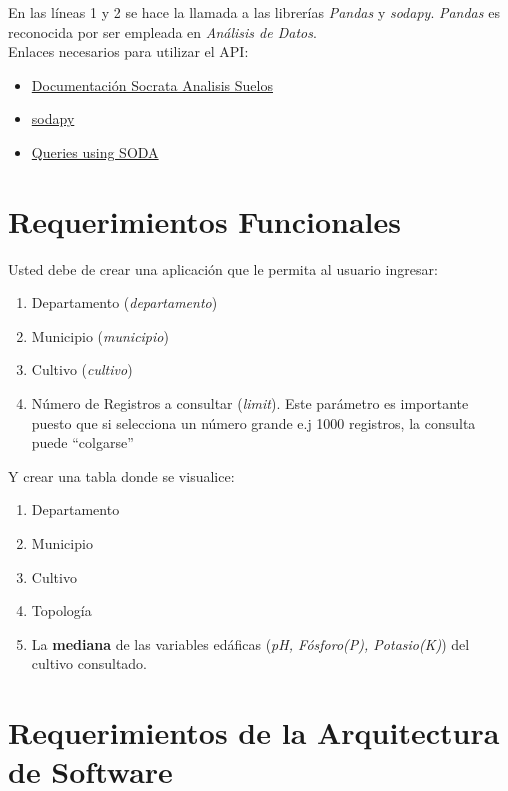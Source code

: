 \documentclass[12pt]{article}
\begin{document}
En las líneas 1 y 2 se hace la llamada a las librerías \textit{Pandas} y \textit{sodapy}. \textit{Pandas} es reconocida por ser empleada en \textit{Análisis de Datos}.\\

Enlaces necesarios para utilizar el API:

\begin{itemize}
    \item \href{https://dev.socrata.com/foundry/www.datos.gov.co/ch4u-f3i5}{Documentación Socrata Analisis Suelos} 
    \item \href{https://github.com/xmunoz/sodapy}{sodapy} \item \href{https://dev.socrata.com/docs/queries/}{Queries using SODA}
\end{itemize}



\section{Requerimientos Funcionales}
\label{requerimientos_funcionales}

Usted debe de crear una aplicación que le permita al usuario ingresar: 

\begin{enumerate}
    \item Departamento (\textit{departamento})
    \item Municipio (\textit{municipio})
    \item Cultivo (\textit{cultivo})
    \item Número de Registros a consultar (\textit{limit}). Este parámetro es importante puesto que si selecciona un número grande e.j 1000 registros, la consulta puede ``colgarse''
\end{enumerate}

Y crear una tabla donde se visualice: 

\begin{enumerate}
    \item Departamento
    \item Municipio 
    \item Cultivo
    \item Topología
    \item La \textbf{mediana} de las variables edáficas (\textit{pH, Fósforo(P), Potasio(K)}) del cultivo consultado.
\end{enumerate}


\section{Requerimientos de la Arquitectura de Software}
\end{document}
